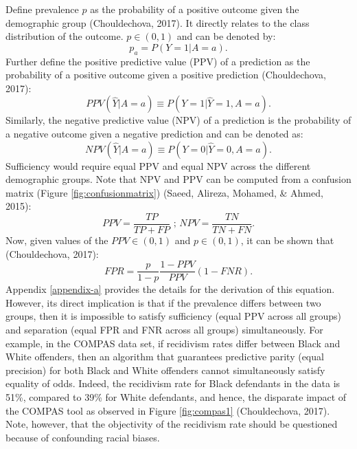 \documentclass[12pt, twoside]{amherstthesis}
\begin{document}
Define prevalence \(p\) as the probability of a positive outcome given the demographic group (Chouldechova, 2017). It directly relates to the class distribution of the outcome. \(p \in (0,1)\) and can be denoted by:
\begin{equation}
\label{ch1eq14}
p_a = P(Y=1|A=a).
\end{equation}
Further define the positive predictive value (PPV) of a prediction as the probability of a positive outcome given a positive prediction (Chouldechova, 2017):
\begin{equation}
\label{ch1eq15}
PPV(\hat{Y}|A = a) \equiv P (Y = 1| \hat{Y} = 1, A = a).
\end{equation}
Similarly, the negative predictive value (NPV) of a prediction is the probability of a negative outcome given a negative prediction and can be denoted as:
\begin{equation}
\label{ch1eq16}
NPV(\hat{Y}|A = a) \equiv P (Y = 0| \hat{Y} = 0, A = a).
\end{equation}
Sufficiency would require equal PPV and equal NPV across the different demographic groups. Note that NPV and PPV can be computed from a confusion matrix (Figure \ref{fig:confusionmatrix}) (Saeed, Alireza, Mohamed, \& Ahmed, 2015):
\begin{equation}
\label{ch1eq17}
PPV = \frac{TP}{TP + FP} \text{   ;   } NPV = \frac{TN}{TN + FN}.
\end{equation}
Now, given values of the \(PPV \in (0,1)\) and \(p \in (0,1)\), it can be shown that (Chouldechova, 2017):
\begin{equation}
\label{ch1eq18}
FPR = \frac{p}{1-p} \frac{1-PPV}{PPV}(1 - FNR).
\end{equation}
Appendix \ref{appendix-a} provides the details for the derivation of this equation. However, its direct implication is that if the prevalence differs between two groups, then it is impossible to satisfy sufficiency (equal PPV across all groups) and separation (equal FPR and FNR across all groups) simultaneously. For example, in the COMPAS data set, if recidivism rates differ between Black and White offenders, then an algorithm that guarantees predictive parity (equal precision) for both Black and White offenders cannot simultaneously satisfy equality of odds. Indeed, the recidivism rate for Black defendants in the data is 51\%, compared to 39\% for White defendants, and hence, the disparate impact of the COMPAS tool as observed in Figure \ref{fig:compas1} (Chouldechova, 2017). Note, however, that the objectivity of the recidivism rate should be questioned because of confounding racial biases.
\end{document}

